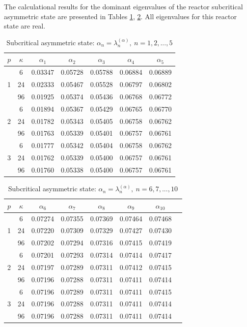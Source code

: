 \documentclass[authoryear]{elsarticle}
\begin{document}
The calculational results for the dominant eigenvalues of the reactor subcritical asymmetric state are presented in Tables \ref{t-8}, \ref{t-9}. All eigenvalues for this reactor state are real. 

\begin{table}[h]
\caption{Subcritical asymmetric state: $\alpha_n = \lambda_n^{(\alpha )}, \ n = 1,2, ..., 5$}
\label{t-8}
\begin{center}
\begin{tabular}{ccccccc}
\hline
$p$ & $\kappa$ & $\alpha_1$ &  $\alpha_2$ & $\alpha_3$ &  $\alpha_4$ & $\alpha_5$ \\ 
\hline
   & 6 & 0.03347 & 0.05728 & 0.05788 & 0.06884 & 0.06889 \\ 
1 & 24 & 0.02333 & 0.05467 & 0.05528 & 0.06797 & 0.06802 \\ 
  & 96 & 0.01925 & 0.05374 & 0.05436 & 0.06768 & 0.06772 \\ 
\hline
   & 6 & 0.01894 & 0.05367 & 0.05429 & 0.06765 & 0.06770 \\ 
2 & 24 & 0.01782 & 0.05343 & 0.05405 & 0.06758 & 0.06762 \\ 
  & 96 & 0.01763 & 0.05339 & 0.05401 & 0.06757 & 0.06761 \\ 
\hline
   & 6 & 0.01777 & 0.05342 & 0.05404 & 0.06758 & 0.06762 \\ 
3 & 24 & 0.01762 & 0.05339 & 0.05400 & 0.06757 & 0.06761 \\ 
  & 96 & 0.01760 & 0.05338 & 0.05400 & 0.06757 & 0.06761 \\ 
\hline
\end{tabular}
\end{center}
\end{table}

\begin{table}[h]
\caption{Subcritical asymmetric state:  $\alpha_n = \lambda_n^{(\alpha )}, \ n = 6,7, ..., 10$}
\label{t-9}
\begin{center}
\begin{tabular}{cccccccc}
\hline
$p$ & $\kappa$ & $\alpha_6$ &  $\alpha_7$ & $\alpha_8$ &  $\alpha_9$ & $\alpha_{10}$ \\  
\hline
   & 6 & 0.07274 & 0.07355 & 0.07369 & 0.07464 & 0.07468 \\ 
1 & 24 & 0.07220 & 0.07309 & 0.07329 & 0.07427 & 0.07430 \\
  & 96 & 0.07202 & 0.07294 & 0.07316 & 0.07415 & 0.07419 \\ 
\hline
   & 6 & 0.07201 & 0.07293 & 0.07314 & 0.07414 & 0.07417 \\
2 & 24 & 0.07197 & 0.07289 & 0.07311 & 0.07412 & 0.07415 \\ 
  & 96 & 0.07196 & 0.07288 & 0.07311 & 0.07411 & 0.07414 \\ 
\hline
   & 6 & 0.07196 & 0.07289 & 0.07311 & 0.07411 & 0.07415 \\ 
3 & 24 & 0.07196 & 0.07288 & 0.07311 & 0.07411 & 0.07414 \\ 
  & 96 & 0.07196 & 0.07288 & 0.07311 & 0.07411 & 0.07414 \\ 
\hline
\end{tabular}
\end{center}
\end{table}
\end{document}
